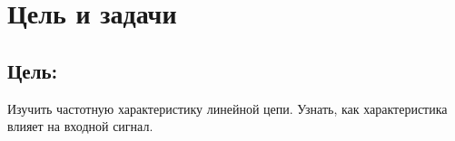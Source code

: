 \chapter*{Цель и задачи}
\label{ch:intro}

\section*{\textbf{Цель:}}

Изучить частотную характеристику линейной цепи. Узнать, как характеристика влияет на входной сигнал.

\endinput